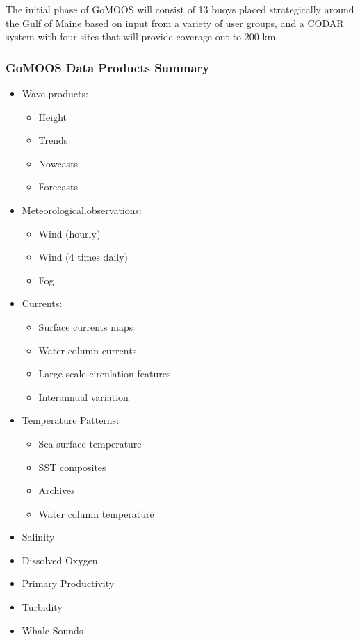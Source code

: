 The initial phase of GoMOOS will consist of 13 buoys placed
strategically around the Gulf of Maine based on input from a variety
of user groups, and a CODAR system with four sites that will provide
coverage out to 200 km.

\subsubsection{GoMOOS Data Products Summary}

\begin{itemize}

\item Wave products:
\begin{itemize}
\item Height
\item Trends
\item Nowcasts
\item Forecasts
\end{itemize}

\item Meteorological.observations:
\begin{itemize}
\item Wind (hourly)
\item Wind (4 times daily)
\item Fog
\end{itemize}


\item Currents:
\begin{itemize}
\item Surface currents maps
\item Water column currents
\item Large scale circulation features
\item Interannual variation
\end{itemize}


\item Temperature Patterns:
\begin{itemize}
\item Sea surface temperature
\item SST composites
\item Archives
\item Water column temperature
\end{itemize}

\item Salinity

\item Dissolved Oxygen

\item Primary Productivity

\item Turbidity

\item Whale Sounds
\end{itemize}

